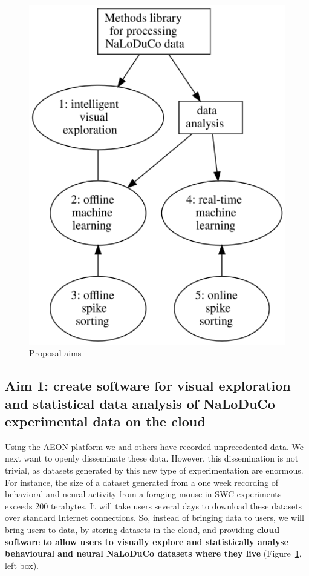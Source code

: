 \documentclass[12pt]{article}
\begin{document}
\begin{figure}
    \begin{center}
        \includegraphics[width=5in]{figures/aims.png}
    \end{center}
    \caption{Proposal aims}
    \label{fig:aims}
\end{figure}

\subsection*{Aim 1: create software for visual exploration and statistical data
analysis of NaLoDuCo experimental data on the cloud}

Using the AEON platform we and others have recorded unprecedented data. We next
want to openly disseminate these data. However, this dissemination is not
trivial, as datasets generated by this new type of experimentation are
enormous. For instance, the size of a dataset generated from a one week
recording of behavioral and neural activity from a foraging mouse in SWC
experiments exceeds 200 terabytes. It will take users several days to download
these datasets over standard Internet connections.
%
So, instead of bringing data to users, we will bring users to data, by storing
datasets in the cloud, and providing \textbf{cloud software to allow users to visually
explore and statistically analyse behavioural and neural NaLoDuCo datasets
where they live} (Figure~\ref{fig:aims}, left box).
\end{document}
